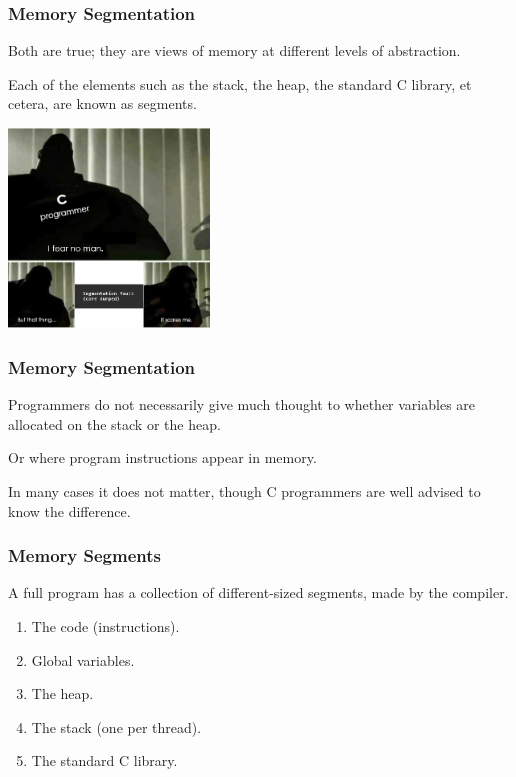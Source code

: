 \begin{frame}
\frametitle{Memory Segmentation}

Both are true; they are views of memory at different levels of abstraction. 

Each of the elements such as the stack, the heap, the standard C library, et cetera, are known as \alert{segments}.

\begin{center}
	\includegraphics[width=0.4\textwidth]{images/segfault.png}
\end{center}


\end{frame}

\begin{frame}
\frametitle{Memory Segmentation}

Programmers do not necessarily give much thought to whether variables are allocated on the stack or the heap.

Or where program instructions appear in memory. 

In many cases it does not matter, though C programmers are well advised to know the difference.


\end{frame}

\begin{frame}
\frametitle{Memory Segments}

A full program has a collection of different-sized segments, made by the compiler.

\begin{enumerate}
	\item The code (instructions).
	\item Global variables.
	\item The heap.
	\item The stack (one per thread).
	\item The standard C library.
\end{enumerate}

\end{frame}

